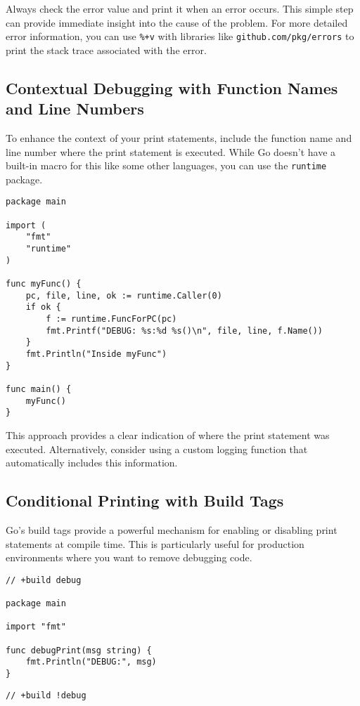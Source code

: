 \documentclass{article}
\begin{document}
{{{{Always check the error value and print it when an error occurs. This simple step can provide immediate insight into the cause of the problem. For more detailed error information, you can use \texttt{\%+v} with libraries like \texttt{github.com/pkg/errors} to print the stack trace associated with the error.

\subsection*{Contextual Debugging with Function Names and Line Numbers}

To enhance the context of your print statements, include the function name and line number where the print statement is executed. While Go doesn't have a built-in macro for this like some other languages, you can use the \texttt{runtime} package.

\begin{verbatim}
package main

import (
    "fmt"
    "runtime"
)

func myFunc() {
    pc, file, line, ok := runtime.Caller(0)
    if ok {
        f := runtime.FuncForPC(pc)
        fmt.Printf("DEBUG: %s:%d %s()\n", file, line, f.Name())
    }
    fmt.Println("Inside myFunc")
}

func main() {
    myFunc()
}
\end{verbatim}

This approach provides a clear indication of where the print statement was executed. Alternatively, consider using a custom logging function that automatically includes this information.

\subsection*{Conditional Printing with Build Tags}

Go's build tags provide a powerful mechanism for enabling or disabling print statements at compile time.  This is particularly useful for production environments where you want to remove debugging code.

\begin{verbatim}
// +build debug

package main

import "fmt"

func debugPrint(msg string) {
    fmt.Println("DEBUG:", msg)
}
\end{verbatim}

\begin{verbatim}
// +build !debug


\end{verbatim}}}}}
\end{document}
